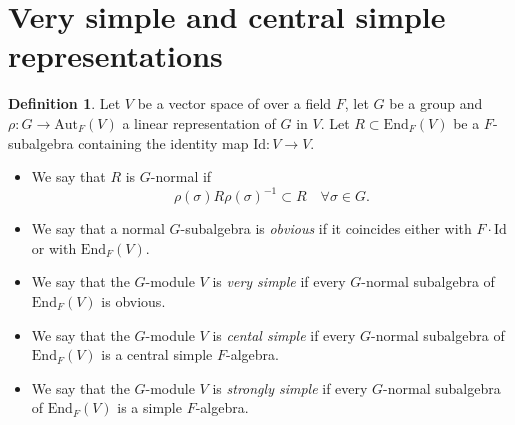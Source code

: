 \documentclass[12pt,a4paper,reqno]{amsart}
\def\End{\mathrm{End}}
\def\Aut{\mathrm{Aut}}
\def\Id{\mathrm{Id}}
\theoremstyle{definition}
\newtheorem{defn}[thm]{Definition}
\begin{document}
\section{Very simple and central simple representations}
\label{verySR}
\begin{defn}
Let $V$ be a vector space of over a field $F$, let $G$ be a group and
$\rho: G \to \Aut_F(V)$ a linear representation of $G$ in $V$.
Let $R \subset \End_F(V)$ be a $F$-subalgebra containing the
identity map $\Id: V \to V$. 
\begin{itemize}
\item[(i)]
We say that $R$ is $G$-normal if
 $$\rho(\sigma) R \rho(\sigma)^{-1} \subset R \quad \forall
 \sigma \in G.$$
 \item[(ii)]
 We say that a normal $G$-subalgebra is {\sl obvious} if it coincides either
 with $F \cdot  \Id$ or with $\End_F(V)$.
  \item[(iii)]
 We say that  the $G$-module $V$ is {\sl very simple} if 
 every  $G$-normal subalgebra of $\End_F(V)$ is obvious.
  \item[(iii)]
 We say that  the $G$-module $V$ is {\sl cental simple} if 
 every  $G$-normal subalgebra of $\End_F(V)$  is a central simple $F$-algebra.
   \item[(iv)]
 We say that  the $G$-module $V$ is {\sl strongly simple} if 
 every  $G$-normal subalgebra of $\End_F(V)$  is a  simple $F$-algebra.
 \end{itemize}
\end{defn}
\end{document}
